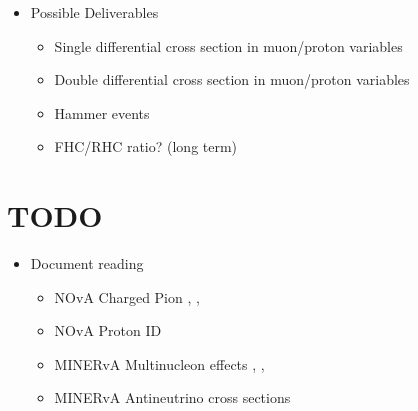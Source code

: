 \documentclass[11pt]{article}
\begin{document}
\begin{itemize}
    
    \item Possible Deliverables
    	\begin{itemize}
    		\item Single differential cross section in muon/proton variables 
    		\item Double differential cross section in muon/proton variables
            \item Hammer events
            \item FHC/RHC ratio? (long term)
	\end{itemize}
    
\end{itemize}



\section{TODO}
\begin{itemize}
	\item Document reading
    \begin{itemize}
   		\item NOvA Charged Pion \cite{ccpiArisDPFtalk} \cite{ccpiArisDPFblessingpack}, \cite{ccpiArisNDTalk1}, \cite{ccpiArisNDTalk2}
        \item NOvA Proton ID \cite{protonIDMerritt}
        \item MINERvA Multinucleon effects \cite{mnvWCRodriguesMultinucleon}, \cite{Rodrigues:2015hik}, 
        \item MINERvA Antineutrino cross sections \cite{Patrick:2018gvi} 
    \end{itemize}
    

\end{itemize}





%
\newpage


\end{document}
